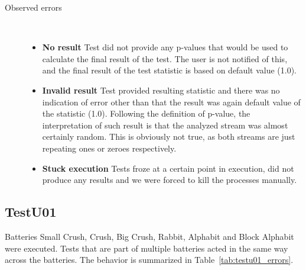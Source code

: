 \documentclass[
	digital,    %
	oneside,
	color,
	11pt,
	nocover,
	notable,
	nolof,
	nolot,
]{fithesis3}
\newenvironment{titlemize}[1]
{
	\begin{description}
	\item[#1]\
	\begin{itemize}
}
{
	\end{itemize}
 	\end{description}
}
\theoremstyle{definition}
\theoremstyle{remark}
\begin{document}
\begin{titlemize}{Observed errors}
\item \textbf{No result} Test did not provide any p-values that would be used to calculate the final result of the test. The user is not notified of this, and the final result of the test statistic is based on default value (1.0).
\item \textbf{Invalid result} Test provided resulting statistic and there was no indication of error other than that the result was again default value of the statistic (1.0). Following the definition of p-value, the interpretation of such result is that the analyzed stream was almost certainly random. This is obviously not true, as both streams are just repeating ones or zeroes respectively. 
\item \textbf{Stuck execution} Tests froze at a certain point in execution, did not produce any results and we were forced to kill the processes manually.
\end{titlemize}

\subsection*{TestU01}
Batteries Small Crush, Crush, Big Crush, Rabbit, Alphabit and Block Alphabit were executed. Tests that are part of multiple batteries acted in the same way across the batteries. The behavior is summarized in Table~\ref{tab:testu01_errors}.
\end{document}
